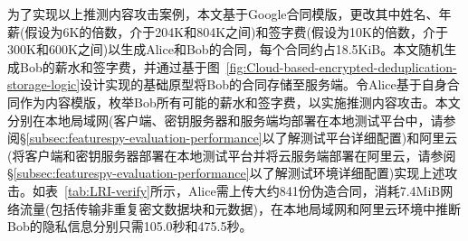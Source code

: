 为了实现以上推测内容攻击案例，本文基于Google合同模版，更改其中姓名、年薪(假设为6K的倍数，介于204K和804K之间)和签字费(假设为10K的倍数，介于300K和600K之间)以生成Alice和Bob的合同，每个合同约占18.5KiB。本文随机生成Bob的薪水和签字费，并通过基于图~\ref{fig:Cloud-based-encrypted-deduplication-storage-logic}设计实现的基础原型将Bob的合同存储至服务端。令Alice基于自身合同作为内容模版，枚举Bob所有可能的薪水和签字费，以实施推测内容攻击。本文分别在本地局域网(客户端、密钥服务器和服务端均部署在本地测试平台中，请参阅\S\ref{subsec:featurespy-evaluation-performance}以了解测试平台详细配置)和阿里云(将客户端和密钥服务器部署在本地测试平台并将云服务端部署在阿里云，请参阅 \S\ref{subsec:featurespy-evaluation-performance}以了解测试环境详细配置)实现上述攻击。如表~\ref{tab:LRI-verify}所示，Alice需上传大约841份伪造合同，消耗7.4MiB网络流量(包括传输非重复密文数据块和元数据)，在本地局域网和阿里云环境中推断Bob的隐私信息分别只需105.0秒和475.5秒。
